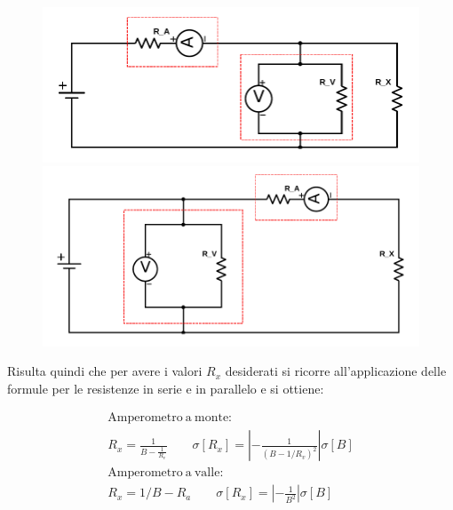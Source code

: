 \documentclass{article}
\begin{document}
\begin{figure}[ht]
	\centering
	 \begin{minipage}{0.5\textwidth}
	     \centering
	     \includegraphics[width=\textwidth]{data/Amperometro_Monte.pdf} 
	 \end{minipage}\hfill
	 \begin{minipage}{0.5\textwidth}
	     \centering
	     \includegraphics[width=\textwidth]{data/Amperometro_Valle.pdf} 
	 \end{minipage}
	 \caption{\label{fig:amp-volt}}
\end{figure}

Risulta quindi che per avere i valori $R_x$ desiderati si ricorre all'applicazione delle formule per le resistenze in serie e in parallelo e si ottiene:

\begin{gather}
	\nonumber \mathrm{Amperometro\ a\ monte:} \\
	R_x=\frac{1}{B-\frac{1}{R_v}} \qquad \sigma[R_x]=\left|-\frac{1}{ \left(B-1/R_v\right) ^2 }\right| \sigma[B] \\
	\nonumber \mathrm{Amperometro\ a\ valle:} \\
	R_x=1/B - R_a \qquad \sigma[R_x] = \left|-\frac{1}{ B ^2 }\right| \sigma[B]
\end{gather}
\end{document}

